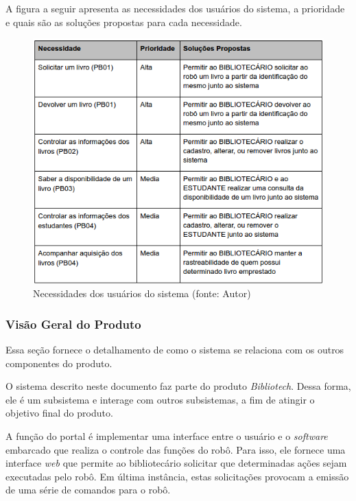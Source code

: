 A figura a seguir apresenta as necessidades dos usuários do sistema, a prioridade e quais são as soluções propostas para cada necessidade.

\begin{figure}[!h]
\centering
\includegraphics[scale=0.65, angle = 360]{figuras/necessidades_soft}
\caption[]{Necessidades dos usuários do sistema (fonte: Autor)}
\label{Necessidades dos usuários do sistema}
\end{figure}
\FloatBarrier

\subsubsection{Visão Geral do Produto}
Essa seção fornece o detalhamento de como o sistema se relaciona com os outros componentes do produto.

O sistema descrito neste documento faz parte do produto \textit{Bibliotech}. Dessa forma, ele é um subsistema e interage com outros subsistemas, a fim de atingir o objetivo final do produto.

A função do portal é implementar uma interface entre o usuário e o \textit{software} embarcado que realiza o controle das funções do robô. Para isso, ele fornece uma interface \textit{web} que permite ao bibliotecário solicitar que determinadas ações sejam executadas pelo robô. Em última instância, estas solicitações provocam a emissão de uma série de comandos para o robô.

